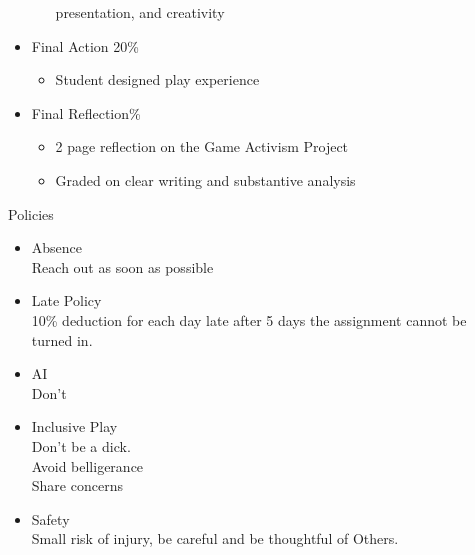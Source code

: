 \documentclass{report}
\begin{document}
\begin{description}
\begin{mdframed}
\begin{itemize}
\begin{itemize}
                            presentation, and
                            creativity
                    \end{itemize}
                \item Final Action 20\%
                    \begin{itemize}
                        \item Student designed play experience
                    \end{itemize}
                \item Final Reflection\%
                    \begin{itemize}
                        \item 2 page reflection on the Game
                            Activism Project
                        \item Graded on clear writing and
                            substantive analysis
                    \end{itemize}
            \end{itemize}
        \end{mdframed}
        \begin{mdframed}
            {\LARGE Policies}
            \begin{itemize}
                \item {\large Absence}\\
                    Reach out as soon as possible
                \item {\large Late Policy}\\
                    10\% deduction for each day late
                    after 5 days the assignment cannot be
                    turned in.
                \item {\large AI}\\
                    Don't
                \item {\large Inclusive Play}\\
                    Don't be a dick.\\
                    Avoid belligerance\\
                    Share concerns
                \item {\large Safety}\\
                    Small risk of injury, be careful
                    and be thoughtful of Others.
            \end{itemize}
        \end{mdframed}
\end{description}
\end{document}

